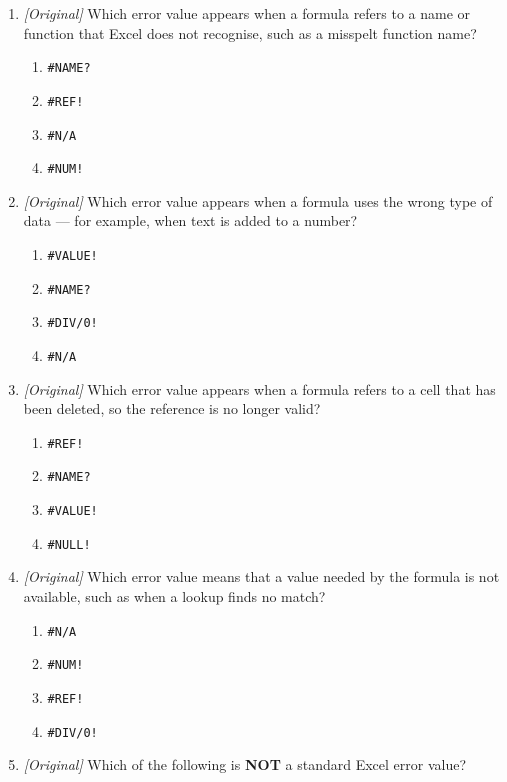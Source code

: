 \documentclass[11pt]{article}
\begin{document}
\begin{enumerate}[label=\textbf{Q\arabic*.}, leftmargin=*]
\begin{enumerate}[label=\Alph*.]
  \end{enumerate}
\item \textit{[Original]} Which error value appears when a formula refers to a
  name or function that Excel does not recognise, such as a misspelt function
  name?
  \begin{enumerate}[label=\Alph*.]
    \item \texttt{\#NAME?}
    \item \texttt{\#REF!}
    \item \texttt{\#N/A}
    \item \texttt{\#NUM!}
  \end{enumerate}
\item \textit{[Original]} Which error value appears when a formula uses the
  wrong type of data --- for example, when text is added to a number?
  \begin{enumerate}[label=\Alph*.]
    \item \texttt{\#VALUE!}
    \item \texttt{\#NAME?}
    \item \texttt{\#DIV/0!}
    \item \texttt{\#N/A}
  \end{enumerate}
\item \textit{[Original]} Which error value appears when a formula refers to a
  cell that has been deleted, so the reference is no longer valid?
  \begin{enumerate}[label=\Alph*.]
    \item \texttt{\#REF!}
    \item \texttt{\#NAME?}
    \item \texttt{\#VALUE!}
    \item \texttt{\#NULL!}
  \end{enumerate}
\item \textit{[Original]} Which error value means that a value needed by the
  formula is not available, such as when a lookup finds no match?
  \begin{enumerate}[label=\Alph*.]
    \item \texttt{\#N/A}
    \item \texttt{\#NUM!}
    \item \texttt{\#REF!}
    \item \texttt{\#DIV/0!}
  \end{enumerate}
\item \textit{[Original]} Which of the following is \textbf{NOT} a standard
  Excel error value?
  \begin{enumerate}[label=\Alph*.]

\end{enumerate}
\end{enumerate}
\end{document}
